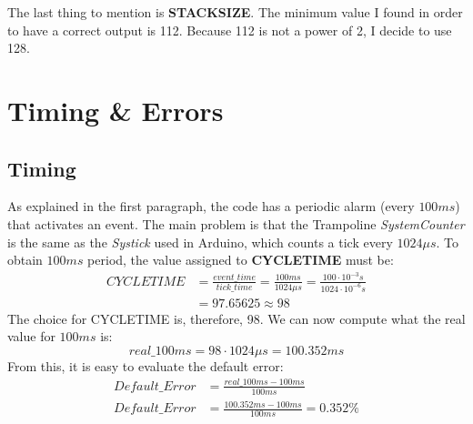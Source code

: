 \documentclass[a4paper]{article}
\begin{document}
The last thing to mention is \textbf{STACKSIZE}. The minimum value I found in order to have a correct output is 112. Because 112 is not a power of 2, I decide to use 128.
\section{Timing \& Errors}
\subsection{Timing} \label{Timing}
As explained in the first paragraph, the code has a periodic alarm (every \(100ms\)) that activates an event. The main problem is that the Trampoline \emph{SystemCounter} is the same as the \emph{Systick} used in Arduino, which counts a tick every \(1024 \mu s\). To obtain \(100ms\) period, the value assigned to  \textbf{CYCLETIME} must be:
\begin{align*}
  CYCLETIME & = \frac{event\_time}{tick\_time} = \frac{100ms}{1024\mu s} = \frac{100 \cdot 10^{-3} s}{1024 \cdot 10^{-6} s} \\[0.5ex]
            & = 97.65625 \approx 98
\end{align*}
The choice for CYCLETIME is, therefore, 98. We can now compute what the real value for \(100ms\) is:
\begin{equation*}
  real\_100ms = 98 \cdot 1024\mu s = 100.352ms
\end{equation*}
From this, it is easy to evaluate the default error:
\begin{align}
  Default\_Error & = \frac{real\_100ms - 100ms}{100ms}                  \label{Default_Error1} \\[0.5ex]
  Default\_Error & = \frac{100.352ms - 100ms}{100ms} = 0.352\%    \label{Default_Error2}
\end{align}
\end{document}
